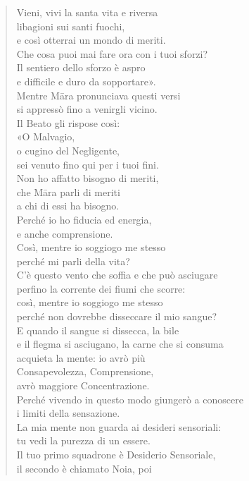 \begin{quote}
Vieni, vivi la santa vita e riversa \\
libagioni sui santi fuochi, \\
e così otterrai un mondo di meriti. \\
Che cosa puoi mai fare ora con i tuoi sforzi? \\
Il sentiero dello sforzo è aspro \\
e difficile e duro da sopportare». \\
Mentre Māra pronunciava questi versi \\
si appressò fino a venirgli vicino. \\
Il Beato gli rispose così: \\
«O Malvagio, \\
o cugino del Negligente, \\
sei venuto fino qui per i tuoi fini. \\
Non ho affatto bisogno di meriti, \\
che Māra parli di meriti \\
a chi di essi ha bisogno. \\
Perché io ho fiducia ed energia, \\
e anche comprensione. \\
Così, mentre io soggiogo me stesso \\
perché mi parli della vita? \\
C’è questo vento che soffia e che può asciugare \\
perfino la corrente dei fiumi che scorre: \\
così, mentre io soggiogo me stesso \\
perché non dovrebbe disseccare il mio sangue? \\
E quando il sangue si dissecca, la bile \\
e il flegma si asciugano, la carne che si consuma \\
acquieta la mente: io avrò più \\
Consapevolezza, Comprensione, \\
avrò maggiore Concentrazione. \\
Perché vivendo in questo modo giungerò a conoscere \\
i limiti della sensazione. \\
La mia mente non guarda ai desideri sensoriali: \\
tu vedi la purezza di un essere. \\
Il tuo primo squadrone è Desiderio Sensoriale, \\
il secondo è chiamato Noia, poi \\

\end{quote}
